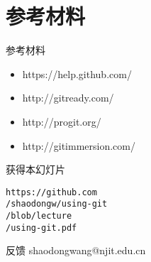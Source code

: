 \part{参考材料}

\begin{frame}[fragile]{参考材料}
    \begin{itemize}
        \item https://help.github.com/
        \item http://gitready.com/
        \item http://progit.org/
        \item http://gitimmersion.com/
    \end{itemize}
\end{frame}

\begin{frame}{获得本幻灯片}

{\Huge\tt https://github.com\\
/shaodongw/using-git\\
/blob/lecture\\
/using-git.pdf\\}
\end{frame}

\begin{frame}[<+->][fragile]{反馈}
shaodongwang@njit.edu.cn
\end{frame}

